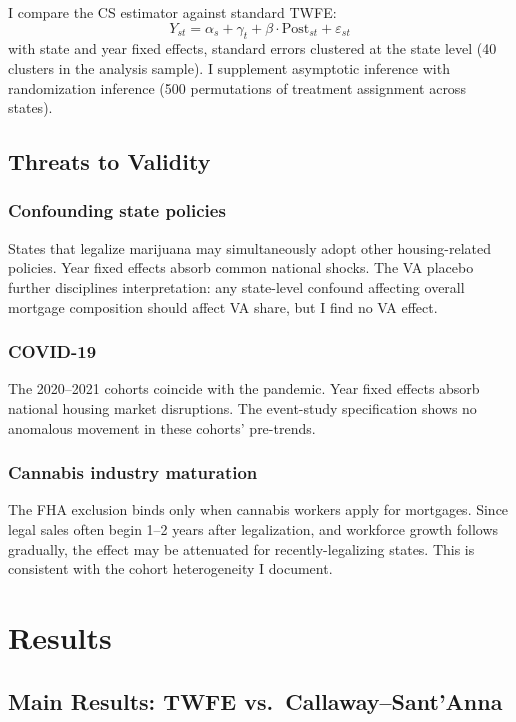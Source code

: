 \documentclass[12pt]{article}
\begin{document}
I compare the CS estimator against standard TWFE:
\begin{equation}
Y_{st} = \alpha_s + \gamma_t + \beta \cdot \text{Post}_{st} + \varepsilon_{st}
\end{equation}
with state and year fixed effects, standard errors clustered at the state level (40 clusters in the analysis sample). I supplement asymptotic inference with randomization inference (500 permutations of treatment assignment across states).

\subsection{Threats to Validity}

\subsubsection*{Confounding state policies} States that legalize marijuana may simultaneously adopt other housing-related policies. Year fixed effects absorb common national shocks. The VA placebo further disciplines interpretation: any state-level confound affecting overall mortgage composition should affect VA share, but I find no VA effect.

\subsubsection*{COVID-19} The 2020--2021 cohorts coincide with the pandemic. Year fixed effects absorb national housing market disruptions. The event-study specification shows no anomalous movement in these cohorts' pre-trends.

\subsubsection*{Cannabis industry maturation} The FHA exclusion binds only when cannabis workers apply for mortgages. Since legal sales often begin 1--2 years after legalization, and workforce growth follows gradually, the effect may be attenuated for recently-legalizing states. This is consistent with the cohort heterogeneity I document.

\section{Results}
\label{sec:results}

\subsection{Main Results: TWFE vs.\ Callaway--Sant'Anna}
\end{document}
